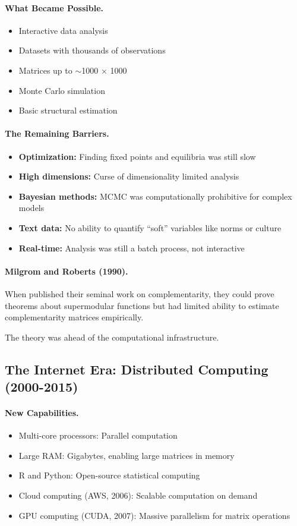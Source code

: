 \paragraph{What Became Possible.}
\begin{itemize}
  \item Interactive data analysis
  \item Datasets with thousands of observations
  \item Matrices up to $\sim$1000 $\times$ 1000
  \item Monte Carlo simulation
  \item Basic structural estimation
\end{itemize}

\paragraph{The Remaining Barriers.}
\begin{itemize}
  \item \textbf{Optimization:} Finding fixed points and equilibria was still slow
  \item \textbf{High dimensions:} Curse of dimensionality limited analysis
  \item \textbf{Bayesian methods:} MCMC was computationally prohibitive for complex models
  \item \textbf{Text data:} No ability to quantify ``soft'' variables like norms or culture
  \item \textbf{Real-time:} Analysis was still a batch process, not interactive
\end{itemize}

\paragraph{Milgrom and Roberts (1990).}
When \citet{milgromroberts1990} published their seminal work on complementarity,
they could prove theorems about supermodular functions but had limited
ability to estimate complementarity matrices empirically.

The theory was ahead of the computational infrastructure.

\subsection{The Internet Era: Distributed Computing (2000-2015)}

\paragraph{New Capabilities.}
\begin{itemize}
  \item Multi-core processors: Parallel computation
  \item Large RAM: Gigabytes, enabling large matrices in memory
  \item R and Python: Open-source statistical computing
  \item Cloud computing (AWS, 2006): Scalable computation on demand
  \item GPU computing (CUDA, 2007): Massive parallelism for matrix operations
\end{itemize}

